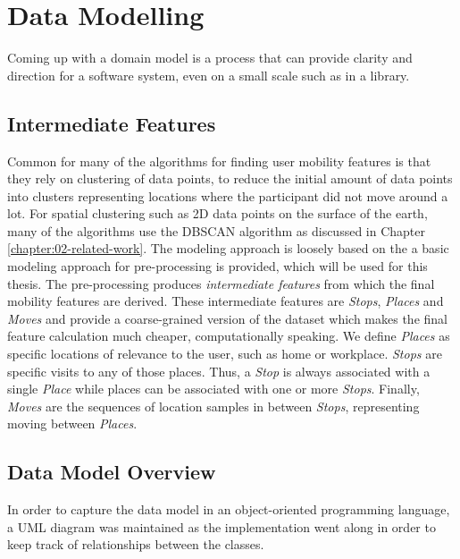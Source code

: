 \section{Data Modelling}
Coming up with a domain model is a process that can provide clarity and direction for a software system, even on a small scale such as in a library. 

\subsection{Intermediate Features}
Common for many of the algorithms for finding user mobility features is that they rely on clustering of data points, to reduce the initial amount of data points into clusters representing locations where the participant did not move around a lot. For spatial clustering such as 2D data points on the surface of the earth, many of the algorithms use the DBSCAN algorithm as discussed in Chapter \ref{chapter:02-related-work}. The modeling approach is loosely based on the \cite{sparse-location-2014} a basic modeling approach for pre-processing is provided, which will be used for this thesis. The pre-processing produces \textit{intermediate features} from which the final mobility features are derived. These intermediate features are \textit{Stops}, \textit{Places} and \textit{Moves} and provide a coarse-grained version of the dataset which makes the final feature calculation much cheaper, computationally speaking. We define \textit{Places} as specific locations of relevance to the user, such as home or workplace. \textit{Stops} are specific visits to any of those places. Thus, a \textit{Stop} is always associated with a single \textit{Place} while places can be associated with one or more \textit{Stops}. Finally, \textit{Moves} are the sequences of location samples in between \textit{Stops}, representing moving between \textit{Places}. 

\subsection{Data Model Overview}
In order to capture the data model in an object-oriented programming language, a UML diagram was maintained as the implementation went along in order to keep track of relationships between the classes. 

